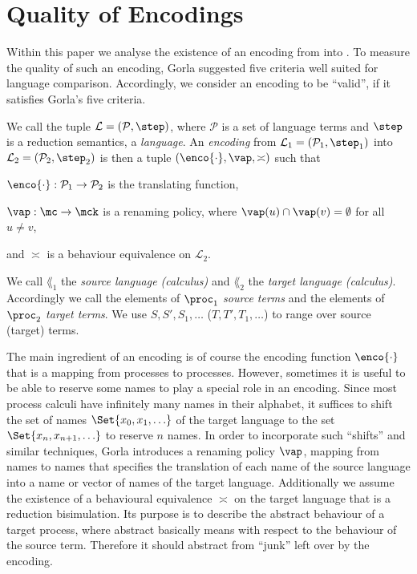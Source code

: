 \documentclass[]{article}
\begin{document}
\section{Quality of Encodings}
\label{sec:quality}

Within this paper we analyse the existence of an encoding from \piT into \piNM. To measure the quality of such an encoding, Gorla \cite{gorla} suggested five criteria well suited for language comparison. Accordingly, we consider an encoding to be ``valid'', if it satisfies Gorla's five criteria.

We call the tuple $ \mathcal{L} = \left( \mathcal{P}, \step \right) $, where $ \mathcal{P} $ is a set of language terms and $ \step $ is a reduction semantics, a \emph{language}.
An \emph{encoding} from $ \mathcal{L}_1 = \left( \mathcal{P}_1, \step_1 \right) $ into $ \mathcal{L}_2 = \left( \mathcal{P}_2, \step_2 \right) $ is then a tuple $(\enco{\cdot}, \vap, \asymp )$ such that
\begin{compactitem}
	\item $ \enco{\cdot} : \mathcal{P}_1 \rightarrow \mathcal{P}_2 $ is the translating function,
	\item $ \vap : \mc \rightarrow \mck $ is a renaming policy, where $ \vap(u) \cap \vap(v) = \emptyset$ for all $ u \neq v $,
	\item and $ \asymp $ is a behaviour equivalence on $ \mathcal{L}_2 $.
\end{compactitem}
We call $ \lang_1 $ the \emph{source language (calculus)} and $ \lang_2 $ the \emph{target language (calculus)}. Accordingly we call the elements of $ \proc_1 $ \emph{source terms} and the elements of $ \proc_2 $ \emph{target terms}.
We use $ S, S', S_1, \ldots $ ($ T, T', T_1, \ldots $) to range over source (target) terms.

The main ingredient of an encoding is of course the encoding function $ \enco{\cdot} $ that is a mapping from processes to processes.
However, sometimes it is useful to be able to reserve some names to play a special role in an encoding.
Since most process calculi have infinitely many names in their alphabet, it suffices to shift the set of names $ \Set{ x_0, x_1, \ldots } $ of the target language to the set $ \Set{ x_n, x_{n+1}, \ldots } $ to reserve $ n $ names. In order to incorporate such ``shifts'' and similar techniques, Gorla introduces a renaming policy $ \vap $, \ie mapping from names to names that specifies the translation of each name of the source language into a name or vector of names of the target language.
Additionally we assume the existence of a behavioural equivalence $ \asymp $ on the target language that is a reduction bisimulation. Its purpose is to describe the abstract behaviour of a target process, where abstract basically means with respect to the behaviour of the source term. Therefore it should abstract from ``junk'' left over by the encoding.
\end{document}
